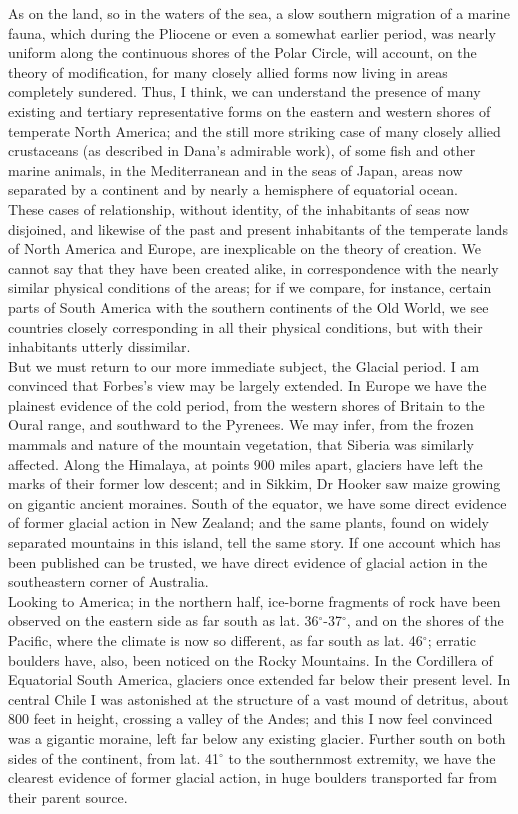 \indent As on the land, so in the waters of the sea, a slow southern migration of a marine fauna, which during the Pliocene or even a somewhat earlier period, was nearly uniform along the continuous shores of the Polar Circle, will account, on the theory of modification, for many closely allied forms now living in areas completely sundered. Thus, I think, we can understand the presence of many existing and tertiary representative forms on the eastern and western shores of temperate North America; and the still more striking case of many closely allied crustaceans (as described in Dana's admirable work), of some fish and other marine animals, in the Mediterranean and in the seas of Japan, areas now separated by a continent and by nearly a hemisphere of equatorial ocean.~\\
\indent These cases of relationship, without identity, of the inhabitants of seas now disjoined, and likewise of the past and present inhabitants of the temperate lands of North America and Europe, are inexplicable on the theory of creation. We cannot say that they have been created alike, in correspondence with the nearly similar physical conditions of the areas; for if we compare, for instance, certain parts of South America with the southern continents of the Old World, we see countries closely corresponding in all their physical conditions, but with their inhabitants utterly dissimilar.~\\
\indent But we must return to our more immediate subject, the Glacial period. I am convinced that Forbes's view may be largely extended. In Europe we have the plainest evidence of the cold period, from the western shores of Britain to the Oural range, and southward to the Pyrenees. We may infer, from the frozen mammals and nature of the mountain vegetation, that Siberia was similarly affected. Along the Himalaya, at points 900 miles apart, glaciers have left the marks of their former low descent; and in Sikkim, Dr Hooker saw maize growing on gigantic ancient moraines. South of the equator, we have some direct evidence of former glacial action in New Zealand; and the same plants, found on widely separated mountains in this island, tell the same story. If one account which has been published can be trusted, we have direct evidence of glacial action in the southeastern corner of Australia.~\\
\indent Looking to America; in the northern half, ice-borne fragments of rock have been observed on the eastern side as far south as lat. 36$^{\circ}$-37$^{\circ}$, and on the shores of the Pacific, where the climate is now so different, as far south as lat. 46$^{\circ}$; erratic boulders have, also, been noticed on the Rocky Mountains. In the Cordillera of Equatorial South America, glaciers once extended far below their present level.  In central Chile I was astonished at the structure of a vast mound of detritus, about 800 feet in height, crossing a valley of the Andes; and this I now feel convinced was a gigantic moraine, left far below any existing glacier. Further south on both sides of the continent, from lat. 41$^{\circ}$ to the southernmost extremity, we have the clearest evidence of former glacial action, in huge boulders transported far from their parent source.~\\
